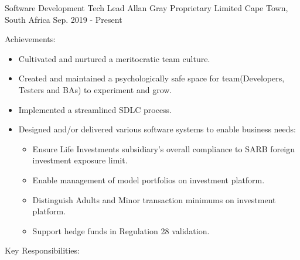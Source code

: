 

\begin{cventries}
  \cventry
    {Software Development Tech Lead} %
    {Allan Gray Proprietary Limited} %
    {Cape Town, South Africa} %
    {Sep. 2019 - Present} %
    {
      \begin{cvitems} %
        \item {Achievements:}
          \begin{itemize}
            \item {Cultivated and nurtured a meritocratic team culture.}
            \item {Created and maintained a psychologically safe space for team(Developers, Testers and BAs) to experiment and grow.}
            \item {Implemented a streamlined SDLC process.}
          \end{itemize}
        \begin{itemize}
          \item {Designed and/or delivered various software systems to enable business needs:}
          \begin{itemize}
            \item {Ensure Life Investments subsidiary's overall compliance to SARB foreign investment exposure limit.}  
            \item {Enable management of model portfolios on investment platform.}
            \item {Distinguish Adults and Minor transaction minimums on investment platform.}
            \item {Support hedge funds in Regulation 28 validation.}
          \end{itemize}
        \end{itemize}
        \item {Key Responsibilities:}
        \begin{itemize}

\end{itemize}
\end{cvitems}}
\end{cventries}
